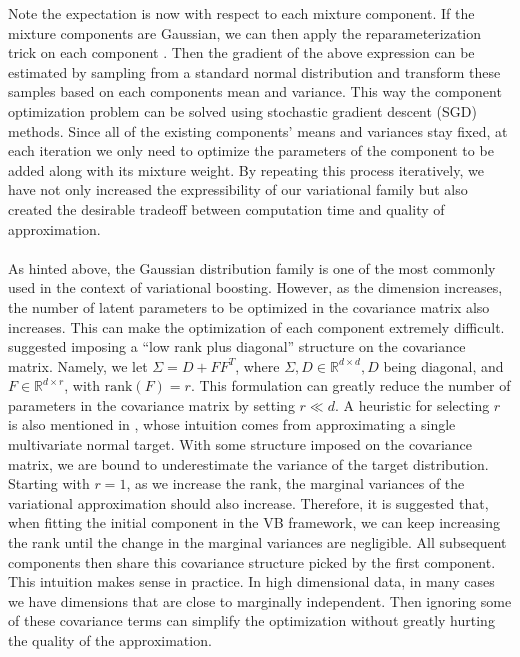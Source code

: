 Note the expectation is now with respect to each mixture component. If the mixture components are Gaussian, we can then apply the reparameterization trick on each component \cite{kingma2013auto}. Then the gradient of the above expression can be estimated by sampling from a standard normal distribution and transform these samples based on each components mean and variance. This way the component optimization problem can be solved using stochastic gradient descent (SGD) methods. Since all of the existing components' means and variances stay fixed, at each iteration we only need to optimize the parameters of the component to be added along with its mixture weight. By repeating this process iteratively, we have not only increased the expressibility of our variational family but also created the desirable tradeoff between computation time and quality of approximation.\\\\
As hinted above, the Gaussian distribution family is one of the most commonly used in the context of variational boosting. However, as the dimension increases, the number of latent parameters to be optimized in the covariance matrix also increases. This can make the optimization of each component extremely difficult. \cite{miller2017variational} suggested imposing a ``low rank plus diagonal'' structure on the covariance matrix. Namely, we let $\Sigma = D + FF^T$, where $\Sigma, D \in \mathbb{R}^{d\times d}, D$ being diagonal, and $F \in \mathbb{R}^{d\times r}$, with $\text{rank}(F)=r$. This formulation can greatly reduce the number of parameters in the covariance matrix by setting $r \ll d$. A heuristic for selecting $r$ is also mentioned in \cite{miller2017variational}, whose intuition comes from approximating a single multivariate normal target. With some structure imposed on the covariance matrix, we are bound to underestimate the variance of the target distribution. Starting with $r=1$, as we increase the rank, the marginal variances of the variational approximation should also increase. Therefore, it is suggested that, when fitting the initial component in the VB framework, we can keep increasing the rank until the change in the marginal variances are negligible. All subsequent components then share this covariance structure picked by the first component. This intuition makes sense in practice. In high dimensional data, in many cases we have dimensions that are close to marginally independent. Then ignoring some of these covariance terms can simplify the optimization without greatly hurting the quality of the approximation.\\\\

